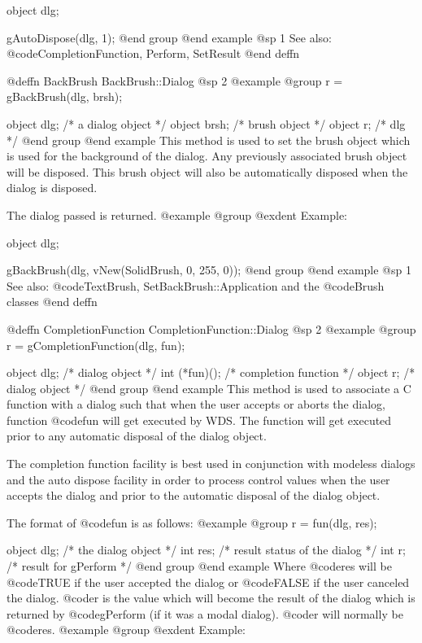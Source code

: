 object  dlg;

gAutoDispose(dlg, 1);
@end group
@end example
@sp 1
See also:  @code{CompletionFunction, Perform, SetResult}
@end deffn














@deffn {BackBrush} BackBrush::Dialog
@sp 2
@example
@group
r = gBackBrush(dlg, brsh);

object  dlg;    /*  a dialog object   */
object  brsh;   /*  brush object      */
object  r;      /*  dlg               */
@end group
@end example
This method is used to set the brush object which is used for the
background of the dialog.  Any previously associated brush object will
be disposed.  This brush object will also be automatically disposed when
the dialog is disposed.

The dialog passed is returned.
@example
@group
@exdent Example:

object  dlg;

gBackBrush(dlg, vNew(SolidBrush, 0, 255, 0));
@end group
@end example
@sp 1
See also:  @code{TextBrush, SetBackBrush::Application}
        and the @code{Brush} classes
@end deffn










@deffn {CompletionFunction} CompletionFunction::Dialog
@sp 2
@example
@group
r = gCompletionFunction(dlg, fun);

object  dlg;       /*  dialog object        */
int     (*fun)();  /*  completion function  */
object  r;         /*  dialog object        */
@end group
@end example
This method is used to associate a C function with a dialog such that
when the user accepts or aborts the dialog, function @code{fun} will
get executed by WDS.  The function will get executed prior to any automatic
disposal of the dialog object.

The completion function facility is best used in conjunction with
modeless dialogs and the auto dispose facility in order to process
control values when the user accepts the dialog and prior to the
automatic disposal of the dialog object.

The format of @code{fun} is as follows:
@example
@group
r = fun(dlg, res);

object  dlg;    /*  the dialog object  */
int     res;    /*  result status of the dialog  */
int     r;      /*  result for gPerform  */
@end group
@end example
Where @code{res} will be @code{TRUE} if the user accepted the dialog or
@code{FALSE} if the user canceled the dialog.  @code{r} is the value
which will become the result of the dialog which is returned by @code{gPerform}
(if it was a modal dialog).  @code{r} will normally be @code{res}.
@example
@group
@exdent Example:

